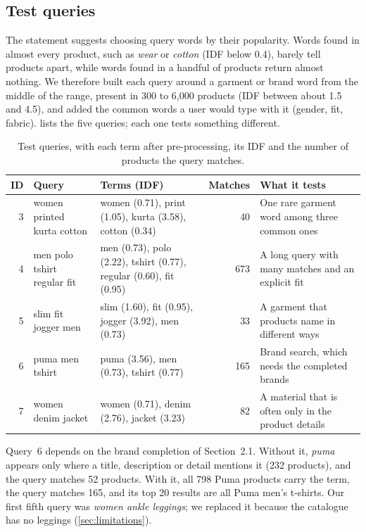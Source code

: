 \documentclass[11pt,a4paper]{article}
\begin{document}
\subsection{Test queries}
\label{sec:test-queries}

The statement suggests choosing query words by their popularity. Words found in
almost every product, such as \emph{wear} or \emph{cotton} (IDF below 0.4),
barely tell products apart, while words found in a handful of products return
almost nothing. We therefore built each query around a garment or brand word
from the middle of the range, present in 300 to 6{,}000 products (IDF between
about 1.5 and 4.5), and added the common words a user would type with it
(gender, fit, fabric).  lists the five queries; each
one tests something different.

\begin{table}[htbp]
  \centering
  \small
  \caption{Test queries, with each term after pre-processing, its IDF and the
  number of products the query matches.}
  \label{tab:test-queries}
  \begin{tabular}{rp{3.1cm}p{4.3cm}rp{3.6cm}}
    \toprule
    ID & Query & Terms (IDF) & Matches & What it tests \\
    \midrule
    3 & women printed kurta cotton & women (0.71), print (1.05), kurta (3.58),
      cotton (0.34) & 40 & One rare garment word among three common ones \\
    4 & men polo tshirt regular fit & men (0.73), polo (2.22), tshirt (0.77),
      regular (0.60), fit (0.95) & 673 & A long query with many matches and an
      explicit fit \\
    5 & slim fit jogger men & slim (1.60), fit (0.95), jogger (3.92),
      men (0.73) & 33 & A garment that products name in different ways \\
    6 & puma men tshirt & puma (3.56), men (0.73), tshirt (0.77) & 165 &
      Brand search, which needs the completed brands \\
    7 & women denim jacket & women (0.71), denim (2.76), jacket (3.23) & 82 &
      A material that is often only in the product details \\
    \bottomrule
  \end{tabular}
\end{table}

Query~6 depends on the brand completion of Section~2.1. Without it,
\emph{puma} appears only where a title, description or detail mentions it
(232 products), and the query matches 52 products. With it, all 798 Puma
products carry the term, the query matches 165, and its top 20 results are all
Puma men's t-shirts. Our first fifth query was \emph{women ankle leggings}; we
replaced it because the catalogue has no leggings (\cref{sec:limitations}).
\end{document}

